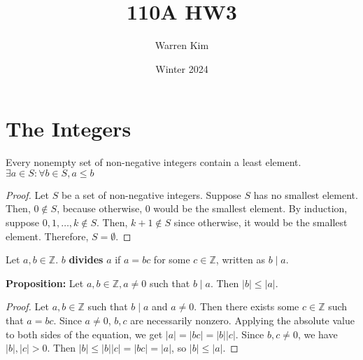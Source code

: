 \documentclass [12pt] {article}
\title{110A HW3}
\author{Warren Kim}
\date{Winter 2024}
\newcommand{\Z}{\mathbb{Z}}
\newenvironment{theorem}[1]{\begin{tcolorbox}[title={Theorem #1}]}{\end{tcolorbox}}
\newenvironment{definition}[1]{\begin{tcolorbox}[title={Definition: #1},colback=green!5!white,colframe=black!75!green]}{\end{tcolorbox}}
\renewcommand{\bf}[1]{\textbf{{#1}}}
\begin{document}
\section{The Integers}
\begin{theorem}{(Well-Ordering Principle)}
Every nonempty set of non-negative integers contain a least element. 
$\exists a \in S : \forall b \in S, a \leq b$
\end{theorem}
\begin{proof}
    Let $S$ be a set of non-negative integers. Suppose $S$ has no smallest element. Then, 
    $0 \not \in S$, because otherwise, $0$ would be the smallest element. By induction, suppose
    $0, 1, \ldots, k \not \in S$. Then, $k + 1 \not \in S$ since otherwise, it would be the smallest
    element. Therefore, $S = \emptyset$.
\end{proof}

\begin{definition}{Divides}
    Let $a, b \in \Z$. $b$ \bf{divides} $a$ if $a = bc$ for some $c \in \Z$, written as $b \mid a$.
\end{definition}
\bf{Proposition:} Let $a, b \in \Z, a \neq 0$ such that $b \mid a$. Then $|b| \leq |a|$.
\begin{proof}
    Let $a, b \in \Z$ such that $b \mid a$ and $a \neq 0$. Then there exists some $c \in \Z$ such that
    $a = bc$. Since $a \neq 0$, $b, c$ are necessarily nonzero. Applying the absolute value to both
    sides of the equation, we get $|a| = |bc| = |b||c|$. Since $b, c \neq 0$, we have $|b|, |c| > 0$.
    Then $|b| \leq |b||c| = |bc| = |a|$, so $|b| \leq |a|$.
\end{proof}
\end{document}
